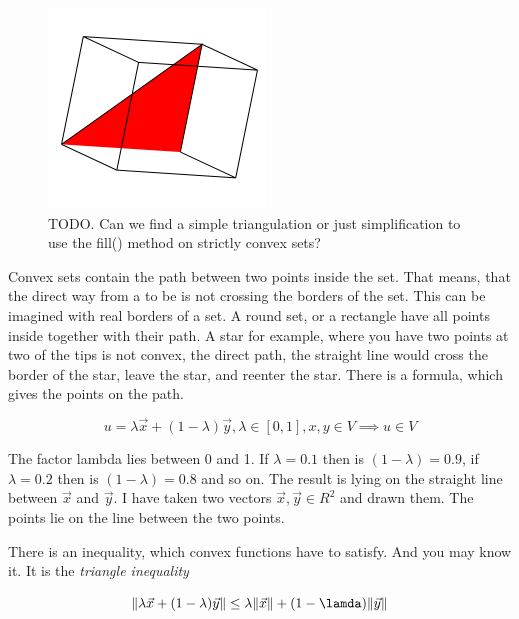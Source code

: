 \documentclass[a4paper]{article}
\begin{document}
\begin{flushleft}
\begin{figure}[ht]

\includegraphics[scale=0.5]{filling.png}
\caption{TODO. Can we find a simple triangulation or just simplification to use the fill() method on strictly convex sets?}

\end{figure}
\end{flushleft}


Convex sets contain the path between two points inside the set. That means, that the direct way from a to be is not crossing the borders of the set. This can be imagined with real borders of a set. A round set, or a rectangle have all points inside together with their path. A star for example, where you have two points at two of the tips is not convex, the direct path, the straight line would cross the border of the star, leave the star, and reenter the star. There is a formula, which gives the points on the path.

\begin{displaymath}
u = \lambda\vec{x} + (1-\lambda)\vec{y}, \lambda \in [0,1], x,y \in V \implies u \in V
\end{displaymath}

The factor lambda lies between 0 and 1. If $\lambda = 0.1$ then is $(1-\lambda) = 0.9$, if $\lambda = 0.2$ then is $(1-\lambda) = 0.8$ and so on. The result is lying on the straight line between $\vec{x}$ and $\vec{y}$. I have taken two vectors $\vec{x}, \vec{y} \in R^2$ and drawn them. The points lie on the line between the two points.

There is an inequality, which convex functions have to satisfy. And you may know it. It is the \emph{triangle inequality}

\begin{displaymath}
\|\lambda\vec{x} + (1-\lambda)\vec{y}\| \leq \lambda\|\vec{x}\| + (1-\lamda)\|\vec{y}\|
\end{displaymath}
\end{document}
